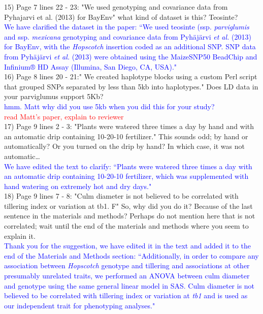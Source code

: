 \documentclass[11pt]{article}
\newcommand{\res}[1]{\noindent \textcolor{blue}{{#1}} \\}
\newcommand{\jri}[1]{\noindent \textcolor{red}{{#1}} \\}
\begin{document}
15) Page 7 lines 22 - 23: "We used genotyping and covariance data from Pyhajarvi et al. (2013) for BayEnv" what kind of dataset is this? Teosinte?\\ 

\res{We have clarified the dataset in the paper: ``We used teosinte (ssp. \emph{parviglumis} and ssp. \emph{mexicana} genotyping and covariance data from Pyh{\"a}j{\"a}rvi \emph{et al.} (2013) for BayEnv, with the \emph{Hopscotch} insertion coded as an additional SNP. SNP data from Pyh{\"a}j{\"a}rvi \emph{et al.} (2013) were obtained using the MaizeSNP50 BeadChip and Infinium® HD Assay (Illumina, San Diego, CA, USA)."}

16) Page 8 lines 20 - 21:" We created haplotype blocks using a custom Perl script that grouped SNPs separated by less than 5kb into haplotypes." Does LD data in your parviglumus support 5Kb?\\ 

\res{hmm. Matt why did you use 5kb when you did this for your study?}
\jri{read Matt's paper, explain to reviewer}

17) Page 9 lines 2 - 3: "Plants were watered three times a day by hand and with an automatic drip containing 10-20-10 fertilizer." This sounds odd; by hand or automatically? Or you turned on the drip by hand? In which case, it was not automatic… \\

\res{We have edited the text to clarify: ``Plants were watered three times a day with an automatic drip containing 10-20-10 fertilizer, which was supplemented with hand watering on extremely hot and dry days."}

18) Page 9 lines 7 - 8: "Culm diameter is not believed to be correlated with tillering index or variation at tb1. F" So, why did you do it? Because of the last sentence in the materials and methods? Perhaps do not mention here that is not correlated; wait until the end of the materials and methods where you seem to explain it.\\ 

\res{Thank you for the suggestion, we have edited it in the text and added it to the end of the Materials and Methods section: ``Additionally, in order to compare any association between \emph{Hopscotch} genotype and tillering and associations at other presumably unrelated traits, we performed an ANOVA between culm diameter and genotype using the same general linear model in SAS. Culm diameter is not believed to be correlated with tillering index or variation at \emph{tb1} and is used as our independent trait for phenotyping analyses."}
\end{document}
